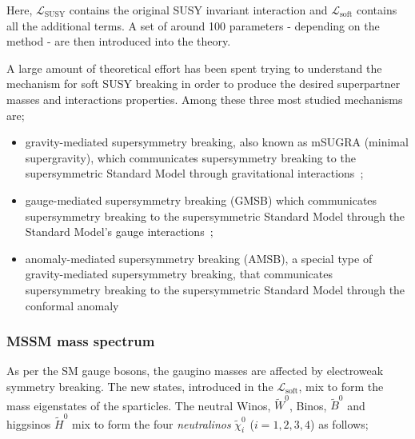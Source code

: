 				\noindent Here, $\mathcal {L_{\mathrm{SUSY}}}$ contains the original SUSY invariant interaction and $\mathcal {L_{\mathrm{soft}}}$ contains all the additional terms. A set of around 100 parameters - depending on the method - are then introduced into the theory.

				A large amount of theoretical effort has been spent trying to understand the mechanism for soft SUSY breaking in order to produce the desired superpartner masses and interactions properties. Among these three most studied mechanisms are; 

				\begin{itemize}
					\item gravity-mediated supersymmetry breaking, also known as mSUGRA (minimal supergravity), which communicates supersymmetry breaking to the supersymmetric Standard Model through gravitational interactions~\cite{PhysRevLett.49.970}; 
					\item gauge-mediated supersymmetry breaking (GMSB) which communicates supersymmetry breaking to the supersymmetric Standard Model through the Standard Model's gauge interactions~\cite{ARBEY2012162}; 
					\item anomaly-mediated supersymmetry breaking (AMSB), a special type of gravity-mediated supersymmetry breaking, that communicates supersymmetry breaking to the supersymmetric Standard Model through the conformal anomaly~\cite{Randall:1998uk, Giudice:1998xp}
				\end{itemize}



			\subsubsection*{MSSM mass spectrum}




				As per the SM gauge bosons, the gaugino masses are affected by electroweak symmetry breaking. The new states, introduced in the $\mathcal L_{\mathrm{soft}}$, mix to form the mass eigenstates of the sparticles. The neutral Winos, $\tilde{W}^0$, Binos, $\tilde{B}^0$ and higgsinos $\tilde{H}^0$ mix to form the four \textit{neutralinos} $\tilde{\chi}^0_i$ ($i=1,2,3,4$) as follows; 

